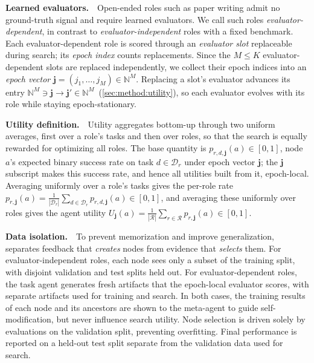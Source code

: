 \noindent\textbf{Learned evaluators.}~~Open-ended roles such as paper writing admit no ground-truth signal and require learned evaluators. We call such roles \emph{evaluator-dependent}, in contrast to \emph{evaluator-independent} roles with a fixed benchmark. Each evaluator-dependent role is scored through an \emph{evaluator slot} replaceable during search; its \emph{epoch index} counts replacements. Since the $M\le K$ evaluator-dependent slots are replaced independently, we collect their epoch indices into an \emph{epoch vector} $\boldsymbol{j}=(j_1,\dots,j_M)\in\mathbb{N}^{M}$. Replacing a slot's evaluator advances its entry $\mathbb{N}^{M}\ni\boldsymbol{j}\rightarrow\boldsymbol{j}'\in\mathbb{N}^{M} $~(\cref{sec:method:utility}), so each evaluator evolves with its role while staying epoch-stationary.

\noindent\textbf{Utility definition.}~~Utility aggregates bottom-up through two uniform averages, first over a role's tasks and then over roles, so that the search is equally rewarded for optimizing all roles.\footnotemark{} The base quantity is $p_{r,d,\boldsymbol{j}}(a)\in[0,1]$, node $a$'s expected binary success rate on task $d\in\mathcal{D}_r$ under epoch vector $\boldsymbol{j}$; the $\boldsymbol{j}$ subscript makes this success rate, and hence all utilities built from it, epoch-local. Averaging uniformly over a role's tasks gives the per-role rate $p_{r,\boldsymbol{j}}(a)=\frac{1}{|\mathcal{D}_r|}\sum_{d\in\mathcal{D}_r}p_{r,d,\boldsymbol{j}}(a)\in[0,1]$, and averaging these uniformly over roles gives the agent utility $U_{\boldsymbol{j}}(a) = \frac{1}{|\mathcal{R}|}\sum_{r\in\mathcal{R}}p_{r,\boldsymbol{j}}(a)\in[0,1]$.


\noindent\textbf{Data isolation.}\label{sec:method:train}~~To prevent memorization and improve generalization, \ourmethod separates feedback that \emph{creates} nodes from evidence that \emph{selects} them. For evaluator-independent roles, each node sees only a subset of the training split, with disjoint validation and test splits held out. For evaluator-dependent roles, the task agent generates fresh artifacts that the epoch-local evaluator scores, with separate artifacts used for training and search. In both cases, the training results of each node and its ancestors are shown to the meta-agent to guide self-modification, but never influence search utility. Node selection is driven solely by evaluations on the validation split, preventing overfitting. Final performance is reported on a held-out test split separate from the validation data used for search.

